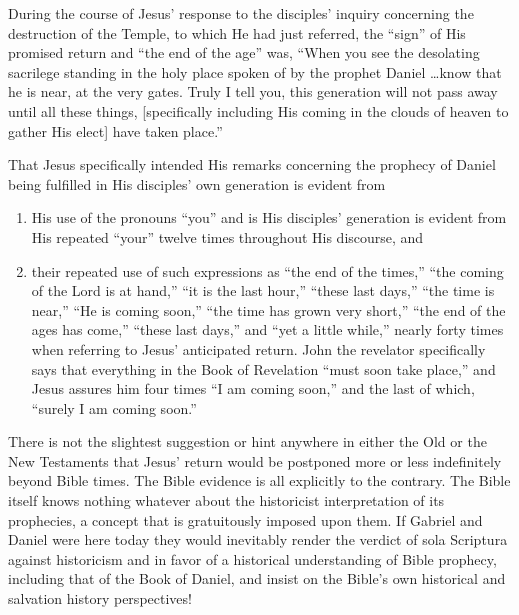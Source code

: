 During the course of Jesus' response to the disciples' inquiry concerning
the destruction of the Temple, to which He had just referred, the ``sign'' of
His promised return and ``the end of the age'' was, ``When you see the
desolating sacrilege standing in the holy place spoken of by the prophet
Daniel \ldots know that he is near, at the very gates. Truly I tell you, this
generation will not pass away until all these things, [specifically
including His coming in the clouds of heaven to gather His elect] have taken
place.''

That Jesus specifically intended His remarks concerning the prophecy of
Daniel being fulfilled in His disciples' own generation is evident from 
\begin{enumerate}
\item
His use of the pronouns ``you'' and is His disciples' generation is
evident from His repeated ``your'' twelve times throughout His discourse, and 
\item
their repeated use of such expressions as ``the end of the times,'' ``the
coming of the Lord is at hand,'' ``it is the last hour,'' ``these last days,''
``the time is near,'' ``He is coming soon,'' ``the time has grown very short,''
``the end of the ages has come,'' ``these last days,'' and ``yet a little while,''
nearly forty times when referring to Jesus' anticipated return. John the
revelator specifically says that everything in the Book of Revelation ``must
soon take place,'' and Jesus assures him four times ``I am coming soon,'' and
the last of which, ``surely I am coming soon.''
\end{enumerate}

There is not the slightest suggestion or hint anywhere in either the Old or
the New Testaments that Jesus' return would be postponed more or less
indefinitely beyond Bible times. The Bible evidence is all explicitly to the
contrary. The Bible itself knows nothing whatever about the historicist
interpretation of its prophecies, a concept that is gratuitously imposed
upon them. If Gabriel and Daniel were here today they would inevitably
render the verdict of sola Scriptura against historicism and in favor of a
historical understanding of Bible prophecy, including that of the Book of
Daniel, and insist on the Bible's own historical and salvation history
perspectives! 

